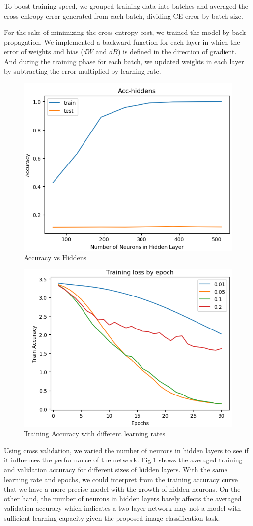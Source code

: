 \documentclass[10pt,conference]{IEEEtran}
\begin{document}
To boost training speed, we grouped training data into batches and averaged the cross-entropy error generated from each batch, dividing CE error by batch size. 

For the sake of minimizing the cross-entropy cost, we trained the model by back propagation. We implemented a backward function for each layer in which the error of weights and bias ($dW$ and $dB$) is defined in the direction of gradient. And during the training phase for each batch, we updated weights in each layer by subtracting the error multiplied by learning rate.

\begin{figure}[!tbhp]
\centering
\includegraphics[width = 0.6\linewidth]{hiddens}
\caption{Accuracy vs Hiddens}
\label{fig:hidden}
\end{figure}

\begin{figure}[!tbhp]
\centering
\includegraphics[width = 0.6\linewidth]{lr}
\caption{Training Accuracy with different learning rates}
\label{fig:lr}
\end{figure}
Using cross validation, we varied the number of neurons in hidden layers to see if it influences the performance of the network. Fig.\ref{fig:hidden} shows the averaged training and validation accuracy for different sizes of hidden layers. With the same learning rate and epochs, we could interpret from the training accuracy curve that we have a more precise model with the growth of hidden neurons. On the other hand, the number of neurons in hidden layers barely affects the averaged validation accuracy which indicates a two-layer network may not a model with sufficient learning capacity given the proposed image classification task.
\end{document}

